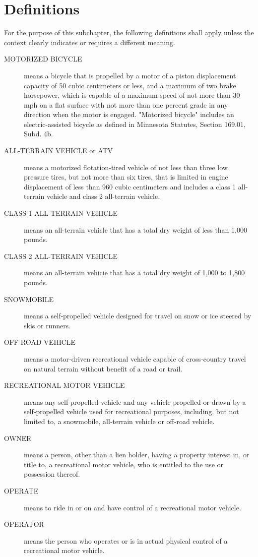 \section{Definitions}
For the purpose of this subchapter, the following definitions shall apply unless the context clearly indicates or requires a different meaning.
\begin{description}
    \item[MOTORIZED BICYCLE] means a bicycle that is propelled by a motor of a piston displacement capacity of 50 cubic centimeters or less, and a maximum of two brake horsepower, which is capable of a maximum speed of not more than 30 mph on a flat surface with not more than one percent grade in any direction when the motor is engaged. "Motorized bicycle" includes an electric-assisted bicycle as defined in Minnesota Statutes, Section 169.01, Subd. 4b.
    \item[ALL-TERRAIN VEHICLE or ATV] means a motorized flotation-tired vehicle of not less than three low pressure tires, but not more than six tires, that is limited in engine displacement of less than 960 cubic centimeters and includes a class 1 all-terrain vehicle and class 2 all-terrain vehicle.
    \item[CLASS 1 ALL-TERRAIN VEHICLE] means an all-terrain vehicle that has a total dry weight of less than 1,000 pounds.
    \item[CLASS 2 ALL-TERRAIN VEHICLE] means an all-terrain vehicie that has a total dry weight of 1,000 to 1,800 pounds.
    \item[SNOWMOBILE] means a self‑propelled vehicle designed for travel on snow or ice steered by skis or runners.
    \item[OFF-ROAD VEHICLE] means a motor‑driven recreational vehicle capable of cross‑country travel on natural terrain without benefit of a road or trail.
    \item[RECREATIONAL MOTOR VEHICLE] means any self‑propelled vehicle and any vehicle propelled or drawn by a self‑propelled vehicle used for recreational purposes, including, but not limited to, a snowmobile, all‑terrain vehicle or off‑road vehicle.
    \item[OWNER] means a person, other than a lien holder, having a property interest in, or title to, a recreational motor vehicle, who is entitled to the use or possession thereof.
    \item[OPERATE] means to ride in or on and have control of a recreational motor vehicle.
    \item[OPERATOR] means the person who operates or is in actual physical control of a recreational motor vehicle.
\end{description}

